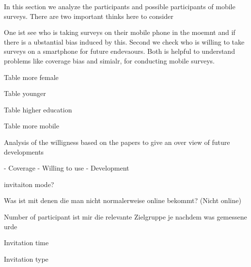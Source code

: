 In this section we analyze the participants and possible participants of mobile surveys. There are two important thinks here to consider

One ist see who is taking surveys on their mobile phone in the moemnt and if there is a ubstantial bias induced by this. Second we check who is willing to take surveys on a smartphone for future endevaours. Both is helpful to understand problems like coverage bias and simialr, for conducting mobile surveys.

Table more female

Table younger

Table higher education

Table more mobile


Analysis of the willigness based on the papers to give an over view of future developments


- Coverage
- Willing to use
- Development

invitaiton mode?


Was ist mit denen die man nicht normalerweise online bekommt? (Nicht online)

Number of participant ist mir die relevante Zielgruppe je nachdem was gemessene urde

Invitation time

Invitation type
